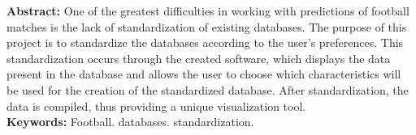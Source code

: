 \begin{singlespace}
\textbf{Abstract: }
One of the greatest difficulties in working with predictions of football matches is the lack of standardization of existing databases. The purpose of this project is to standardize the databases according to the user's preferences. This standardization occurs through the created software, which displays the data present in the database and allows the user to choose which characteristics will be used for the creation of the standardized database. After standardization, the data is compiled, thus providing a unique visualization tool.
\\
\textbf{Keywords: }
Football. databases. standardization.
\end{singlespace}